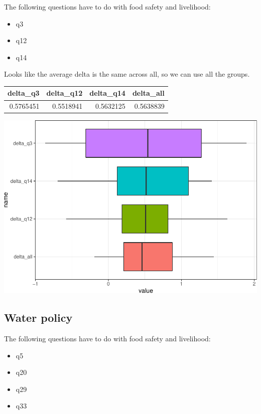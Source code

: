 \documentclass[12pt,]{article}
\providecommand{\tightlist}{%
\setlength{\itemsep}{0pt}\setlength{\parskip}{0pt}}
\begin{document}
The following questions have to do with food safety and livelihood:

\begin{itemize}
\tightlist
\item
  q3
\item
  q12
\item
  q14
\end{itemize}

Looks like the average delta is the same across all, so we can use all
the groups.

\begin{longtable}[]{@{}rrrr@{}}
\toprule
delta\_q3 & delta\_q12 & delta\_q14 & delta\_all\tabularnewline
\midrule
\endhead
0.5765451 & 0.5518941 & 0.5632125 & 0.5638839\tabularnewline
\bottomrule
\end{longtable}

\includegraphics{preanalysis_files/figure-latex/unnamed-chunk-7-1.pdf}

\hypertarget{water-policy}{%
\subsection{Water policy}\label{water-policy}}

The following questions have to do with food safety and livelihood:

\begin{itemize}
\tightlist
\item
  q5
\item
  q20
\item
  q29
\item
  q33
\end{itemize}
\end{document}
